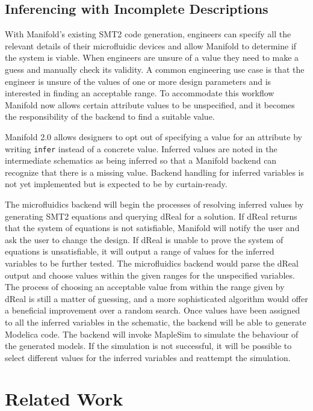 \subsection{Inferencing with Incomplete Descriptions}

With Manifold's existing SMT2 code generation, engineers can specify all the
relevant details of their microfluidic devices and allow Manifold to determine if the system is viable. When engineers
are unsure of a value they need to make a guess and manually check its
validity. A common engineering use case is that the engineer is unsure of the
values of one or more design parameters and is interested in finding an
acceptable range. To accommodate this workflow Manifold now allows certain
attribute values to be unspecified, and it becomes the
responsibility of the backend to find a suitable value.

Manifold 2.0 allows designers to opt out of
specifying a value for an attribute by writing {\tt infer} instead of a
concrete value. Inferred values are noted in the intermediate schematics as
being inferred so that a Manifold backend can recognize that there is a missing value. Backend handling
for inferred variables is not yet implemented but is expected to be by curtain-ready.

The microfluidics backend will begin the processes of resolving inferred values by generating SMT2 equations
and querying dReal for a solution.
If dReal returns that the system of equations is not satisfiable, Manifold will notify the 
user and ask the user to change the design. If dReal is unable to prove the system of equations is unsatisfiable,
it will output a range of values for the inferred variables to be further tested.
The microfluidics backend would parse the dReal output and choose values within the given ranges for the
unspecified variables.
The process of choosing an acceptable value from within the range given by dReal is still a matter of
guessing, and a more sophisticated algorithm would offer a beneficial improvement over a random search.
Once values have been assigned to all the inferred variables in the schematic, the backend will be able
to generate Modelica code.
The backend will invoke MapleSim to simulate the behaviour of the generated models.
If the simulation is not successful, it will be possible to select different values for the inferred variables
and reattempt the simulation.

\section{Related Work}

